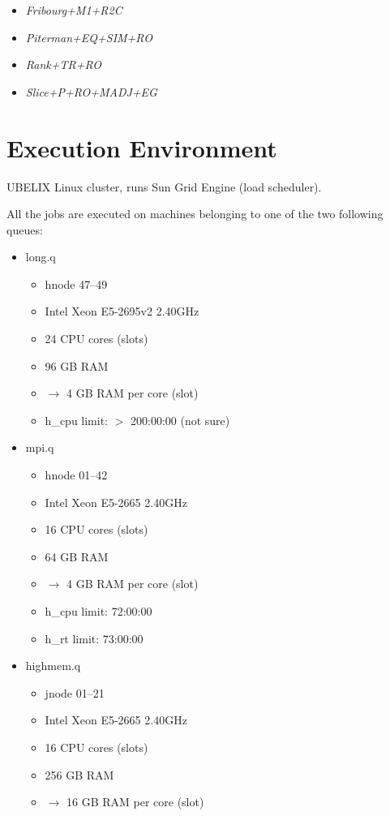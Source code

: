 \begin{itemize}
\item \em{Fribourg+M1+R2C}
\item \em{Piterman+EQ+SIM+RO}
\item \em{Rank+TR+RO}
\item \em{Slice+P+RO+MADJ+EG}
\end{itemize}



\section{Execution Environment}

UBELIX Linux cluster, runs Sun Grid Engine (load scheduler).

All the jobs are executed on machines belonging to one of the two following queues:

\begin{itemize}
\item long.q
  \begin{itemize}
  \item hnode 47--49
  \item Intel Xeon E5-2695v2 2.40GHz
  \item 24 CPU cores (slots)
  \item 96 GB RAM
  \item $\rightarrow$ 4 GB RAM per core (slot)
  \item h\_cpu limit: $>$ 200:00:00 (not sure)
  \end{itemize}
\item mpi.q
  \begin{itemize}
  \item hnode 01--42
  \item Intel Xeon E5-2665 2.40GHz
  \item 16 CPU cores (slots)
  \item 64 GB RAM
  \item $\rightarrow$ 4 GB RAM per core (slot)
  \item h\_cpu limit: 72:00:00
  \item h\_rt limit: 73:00:00
  \end{itemize}
\item highmem.q
  \begin{itemize}
  \item jnode 01--21
  \item Intel Xeon E5-2665 2.40GHz
  \item 16 CPU cores (slots)
  \item 256 GB RAM
  \item $\rightarrow$ 16 GB RAM per core (slot)
  \end{itemize}
\end{itemize}



